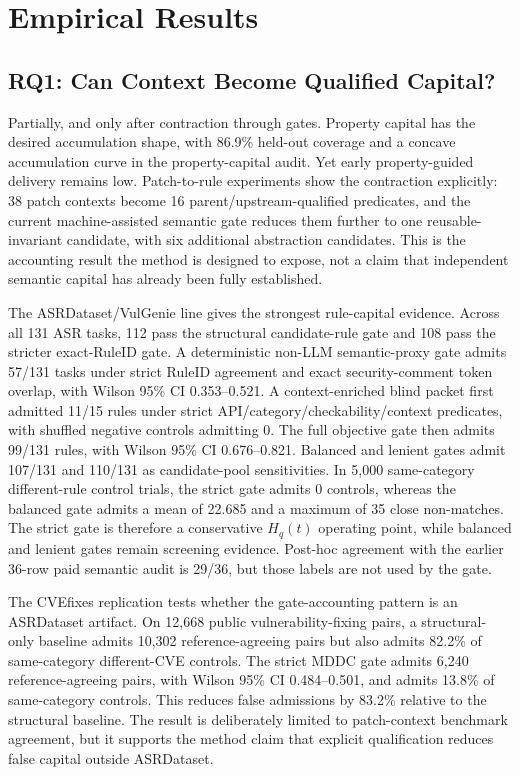 ﻿\documentclass[lettersize,journal]{IEEEtran}
\begin{document}
\section{Empirical Results}
\subsection{RQ1: Can Context Become Qualified Capital?}
Partially, and only after contraction through gates. Property capital has the desired accumulation shape, with 86.9\% held-out coverage and a concave accumulation curve in the property-capital audit. Yet early property-guided delivery remains low. Patch-to-rule experiments show the contraction explicitly: 38 patch contexts become 16 parent/upstream-qualified predicates, and the current machine-assisted semantic gate reduces them further to one reusable-invariant candidate, with six additional abstraction candidates. This is the accounting result the method is designed to expose, not a claim that independent semantic capital has already been fully established.

The ASRDataset/VulGenie line gives the strongest rule-capital evidence. Across all 131 ASR tasks, 112 pass the structural candidate-rule gate and 108 pass the stricter exact-RuleID gate. A deterministic non-LLM semantic-proxy gate admits 57/131 tasks under strict RuleID agreement and exact security-comment token overlap, with Wilson 95\% CI 0.353--0.521. A context-enriched blind packet first admitted 11/15 rules under strict API/category/checkability/context predicates, with shuffled negative controls admitting 0. The full objective gate then admits 99/131 rules, with Wilson 95\% CI 0.676--0.821. Balanced and lenient gates admit 107/131 and 110/131 as candidate-pool sensitivities. In 5,000 same-category different-rule control trials, the strict gate admits 0 controls, whereas the balanced gate admits a mean of 22.685 and a maximum of 35 close non-matches. The strict gate is therefore a conservative $H_q(t)$ operating point, while balanced and lenient gates remain screening evidence. Post-hoc agreement with the earlier 36-row paid semantic audit is 29/36, but those labels are not used by the gate.

The CVEfixes replication tests whether the gate-accounting pattern is an ASRDataset artifact. On 12,668 public vulnerability-fixing pairs, a structural-only baseline admits 10,302 reference-agreeing pairs but also admits 82.2\% of same-category different-CVE controls. The strict MDDC gate admits 6,240 reference-agreeing pairs, with Wilson 95\% CI 0.484--0.501, and admits 13.8\% of same-category controls. This reduces false admissions by 83.2\% relative to the structural baseline. The result is deliberately limited to patch-context benchmark agreement, but it supports the method claim that explicit qualification reduces false capital outside ASRDataset.
\end{document}
